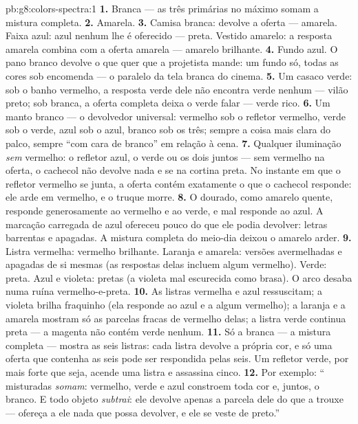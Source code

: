 \begin{solution}{pb:g8:colors-spectra:1}
\textbf{1.} Branca --- as três primárias no máximo somam a mistura
completa.
\textbf{2.} Amarela.
\textbf{3.} Camisa branca: devolve a oferta --- amarela. Faixa azul:
azul nenhum lhe é oferecido --- preta. Vestido amarelo: a resposta
amarela combina com a oferta amarela --- amarelo brilhante.
\textbf{4.} Fundo azul. O pano branco devolve o que quer que a
projetista mande: um fundo só, todas as cores sob encomenda --- o
paralelo da tela branca do cinema.
\textbf{5.} Um casaco verde: sob o banho vermelho, a resposta verde
dele não encontra verde nenhum --- vilão preto; sob  branca, a
oferta completa deixa o verde falar --- verde rico.
\textbf{6.} Um manto branco --- o devolvedor universal: vermelho sob
o refletor vermelho, verde sob o verde, azul sob o azul, branco sob os
três; sempre a coisa mais clara do palco, sempre ``com cara de
branco'' em relação à cena.
\textbf{7.} Qualquer iluminação \emph{sem} vermelho: o refletor azul,
o verde ou os dois juntos --- sem vermelho na oferta, o cachecol não
devolve nada e se  na cortina preta. No instante em que o
refletor vermelho se junta, a oferta contém exatamente o que o
cachecol responde: ele arde em vermelho, e o truque morre.
\textbf{8.} O dourado, como amarelo quente, responde generosamente ao
vermelho e ao verde, e mal responde ao azul. A marcação carregada de
azul ofereceu pouco do que ele podia devolver: letras barrentas e
apagadas. A mistura completa do meio-dia deixou o amarelo arder.
\textbf{9.} Listra vermelha: vermelho brilhante. Laranja e amarela:
versões avermelhadas e apagadas de si mesmas (as respostas delas
incluem algum vermelho). Verde: preta. Azul e violeta: pretas (a
violeta mal escurecida como brasa). O arco desaba numa ruína
vermelho-e-preta.
\textbf{10.} As listras vermelha e azul ressuscitam; a violeta brilha
fraquinho (ela responde ao azul e a algum vermelho); a laranja e a
amarela mostram só as parcelas fracas de vermelho delas; a listra
verde continua preta --- a  magenta não contém verde nenhum.
\textbf{11.} Só a  branca --- a mistura completa --- mostra as seis
listras: cada listra devolve a própria cor, e só uma oferta que
contenha as seis pode ser respondida pelas seis. Um refletor verde,
por mais forte que seja, acende uma listra e assassina cinco.
\textbf{12.} Por exemplo: `` misturadas \emph{somam}: vermelho,
verde e azul constroem toda cor e, juntos, o branco. E todo objeto
\emph{subtrai}: ele devolve apenas a parcela dele do que a 
trouxe --- ofereça a ele nada que possa devolver, e ele se veste de
preto.''
\end{solution}
